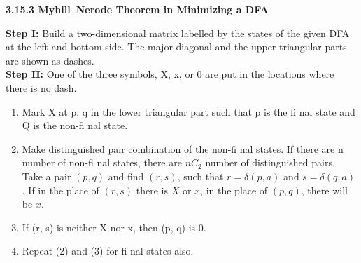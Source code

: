 \documentclass[8pt]{beamer}
\begin{document}
\begin{frame}
\large{
\textbf{3.15.3 Myhill–Nerode Theorem in Minimizing a DFA}
}

\vspace*{0.1cm}
\pause
\textbf{Step I:} Build a two-dimensional matrix labelled by the states of the given DFA at the left and bottom
side. The major diagonal and the upper triangular parts are shown as dashes.\\

\vspace*{1mm}
\textbf{Step II:} One of the three symbols, X, x, or 0 are put in the locations where there is no dash.\\

\vspace*{0.1cm}
\pause
\small{
\begin{enumerate}
  \item Mark X at p, q in the lower triangular part such that p is the fi nal state and Q is the non-fi nal state.\\
  \item Make distinguished pair combination of the non-fi nal states. If there are n number of non-fi nal
states, there are $nC_2$ number of distinguished pairs.\\
Take a pair $(p, q)$ and find $(r, s)$, such that $r = \delta(p, a)$ and $s = \delta(q, a)$. If in the place of $(r, s)$ there
is $X$ or $x$, in the place of $(p, q)$, there will be $x$.\\
  \item If (r, s) is neither X nor x, then (p, q) is 0.\\
  \item Repeat (2) and (3) for fi nal states also.\\
\end{enumerate}
}
\vspace*{0.1cm}
\end{frame}
\end{document}
